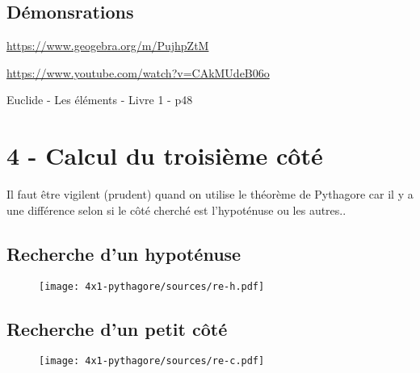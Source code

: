 \documentclass[11pt]{article}
\begin{document}
\subsection*{Démonsrations}

\url{https://www.geogebra.org/m/PujhpZtM}

\url{https://www.youtube.com/watch?v=CAkMUdeB06o}

Euclide - Les éléments - Livre 1 - p48


\section*{4 - Calcul du troisième côté}

Il faut être vigilent (prudent) quand on utilise le théorème de Pythagore car il y a une différence selon si le côté cherché est l'hypoténuse ou les autres..

\subsection*{Recherche d'un hypoténuse}

\begin{figure}[H]
    \centering
    \texttt{[image: 4x1-pythagore/sources/re-h.pdf]}
\end{figure}

\subsection*{Recherche d'un petit côté}

\begin{figure}[H]
    \centering
    \texttt{[image: 4x1-pythagore/sources/re-c.pdf]}
\end{figure}
\end{document}
